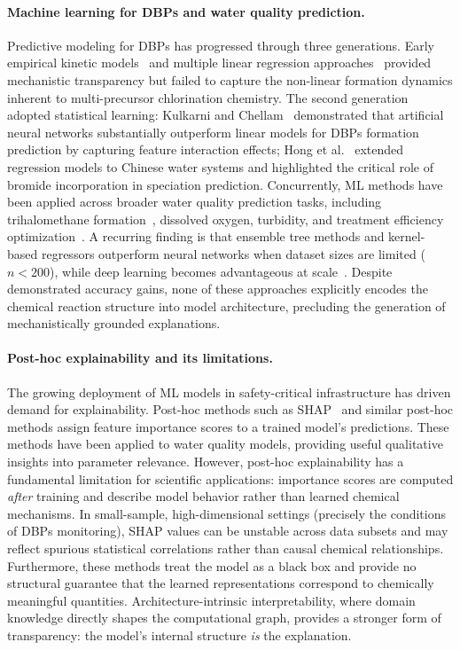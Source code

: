 \documentclass[runningheads]{llncs}
\begin{document}
\paragraph{Machine learning for DBPs and water quality prediction.}
Predictive modeling for DBPs has progressed through three generations. Early empirical kinetic models~\cite{sohn2004disinfectant} and multiple linear regression approaches~\cite{uyak2007multiple} provided mechanistic transparency but failed to capture the non-linear formation dynamics inherent to multi-precursor chlorination chemistry. The second generation adopted statistical learning: Kulkarni and Chellam~\cite{kulkarni2010disinfection} demonstrated that artificial neural networks substantially outperform linear models for DBPs formation prediction by capturing feature interaction effects; Hong et al.~\cite{hong2016using,hong2017bromine} extended regression models to Chinese water systems and highlighted the critical role of bromide incorporation in speciation prediction. Concurrently, ML methods have been applied across broader water quality prediction tasks, including trihalomethane formation~\cite{hong2015use}, dissolved oxygen, turbidity, and treatment efficiency optimization~\cite{sadiq2004disinfection}. A recurring finding is that ensemble tree methods and kernel-based regressors outperform neural networks when dataset sizes are limited ($n < 200$), while deep learning becomes advantageous at scale~\cite{li2018drinking}. Despite demonstrated accuracy gains, none of these approaches explicitly encodes the chemical reaction structure into model architecture, precluding the generation of mechanistically grounded explanations.

\paragraph{Post-hoc explainability and its limitations.}
The growing deployment of ML models in safety-critical infrastructure has driven demand for explainability. Post-hoc methods such as SHAP~\cite{lundberg2017unified} and similar post-hoc methods assign feature importance scores to a trained model's predictions. These methods have been applied to water quality models, providing useful qualitative insights into parameter relevance. However, post-hoc explainability has a fundamental limitation for scientific applications: importance scores are computed \textit{after} training and describe model behavior rather than learned chemical mechanisms. In small-sample, high-dimensional settings (precisely the conditions of DBPs monitoring), SHAP values can be unstable across data subsets and may reflect spurious statistical correlations rather than causal chemical relationships. Furthermore, these methods treat the model as a black box and provide no structural guarantee that the learned representations correspond to chemically meaningful quantities. Architecture-intrinsic interpretability, where domain knowledge directly shapes the computational graph, provides a stronger form of transparency: the model's internal structure \textit{is} the explanation.
\end{document}
